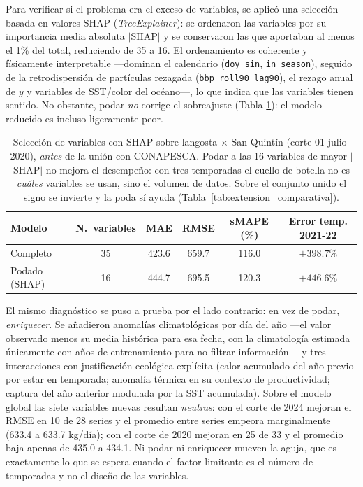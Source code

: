Para verificar si el problema era el exceso de variables, se aplicó una selección basada en valores SHAP \citep{lundberg2017} (\emph{TreeExplainer}): se ordenaron las variables por su importancia media absoluta $|$SHAP$|$ y se conservaron las que aportaban al menos el 1\% del total, reduciendo de 35 a 16. El ordenamiento es coherente y físicamente interpretable ---dominan el calendario (\texttt{doy\_sin}, \texttt{in\_season}), seguido de la retrodispersión de partículas rezagada (\texttt{bbp\_roll90\_lag90}), el rezago anual de $y$ y variables de SST/color del océano---, lo que indica que las variables tienen sentido. No obstante, podar \emph{no} corrige el sobreajuste (Tabla \ref{tab:extension_shap}): el modelo reducido es incluso ligeramente peor.

\begin{table}[htbp]
\centering
\begin{tabular}{lccccc}
\toprule
Modelo & N.\ variables & MAE & RMSE & sMAPE (\%) & Error temp. 2021-22 \\
\midrule
Completo & 35 & 423.6 & 659.7 & 116.0 & $+398.7\%$ \\
Podado (SHAP) & 16 & 444.7 & 695.5 & 120.3 & $+446.6\%$ \\
\bottomrule
\end{tabular}
\caption{Selección de variables con SHAP sobre langosta $\times$ San Quintín (corte 01-julio-2020), \emph{antes} de la unión con CONAPESCA. Podar a las 16 variables de mayor $|$SHAP$|$ no mejora el desempeño: con tres temporadas el cuello de botella no es \emph{cuáles} variables se usan, sino el volumen de datos. Sobre el conjunto unido el signo se invierte y la poda sí ayuda (Tabla~\ref{tab:extension_comparativa}).}
\label{tab:extension_shap}
\end{table}

El mismo diagnóstico se puso a prueba por el lado contrario: en vez de podar, \emph{enriquecer}. Se añadieron anomalías climatológicas por día del año ---el valor observado menos su media histórica para esa fecha, con la climatología estimada únicamente con años de entrenamiento para no filtrar información--- y tres interacciones con justificación ecológica explícita (calor acumulado del año previo por estar en temporada; anomalía térmica en su contexto de productividad; captura del año anterior modulada por la SST acumulada). Sobre el modelo global las siete variables nuevas resultan \emph{neutras}: con el corte de 2024 mejoran el RMSE en 10 de 28 series y el promedio entre series empeora marginalmente (633.4 a 633.7 kg/día); con el corte de 2020 mejoran en 25 de 33 y el promedio baja apenas de 435.0 a 434.1. Ni podar ni enriquecer mueven la aguja, que es exactamente lo que se espera cuando el factor limitante es el número de temporadas y no el diseño de las variables.

